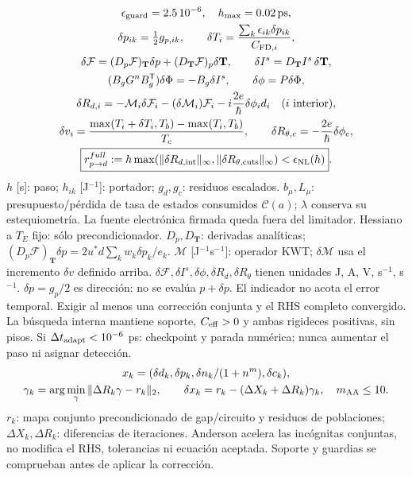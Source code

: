 \documentclass[11pt,a4paper]{article}
\begin{document}
\begin{gather}
 \epsilon_{\rm guard}=2.5\,10^{-6},\quad h_{\max}=0.02\,\mathrm{ps},\\
 \delta p_{ik}=\tfrac12g_{p,ik},\qquad
 \delta T_i=\frac{\sum_k\epsilon_{ik}\delta p_{ik}}{C_{{\rm FD},i}},\\
 \delta\mathcal F=(D_p\mathcal F)_{\mathbf T}\delta p+
 (D_{\mathbf T}\mathcal F)_p\delta\mathbf T,\qquad
 \delta I^s=D_{\mathbf T}I^s\,\delta\mathbf T,\\
 (B_gG^nB_g^{\mathsf T})\delta\Phi=-B_g\delta I^s,\qquad
 \delta\phi=P\delta\Phi,\\
 \delta R_{d,i}=-\mathcal M_i\delta\mathcal F_i
 -(\delta\mathcal M_i)\mathcal F_i
 -i\frac{2e}{\hbar}\delta\phi_i d_i\quad(i\ {\rm interior}),\\
 \delta v_i=\frac{\max(T_i+\delta T_i,T_b)-\max(T_i,T_b)}{T_c},
 \qquad \delta R_{\theta,c}=-\frac{2e}{\hbar}\delta\phi_c,\\
 \boxed{r_{p\to d}^{full}:=h\max\!
 \left(\|\delta R_{d,\rm int}\|_\infty,
       \|\delta R_{\theta,\rm cuts}\|_\infty\right)
 <\epsilon_{\rm NL}(h)}.
\end{gather}
{\small $h$ [s]: paso; $h_{ik}$ [J$^{-1}$]: portador; $g_d,g_c$: residuos escalados.
$b_\mu,L_\mu$: presupuesto/pérdida de tasa de estados consumidos $\mathcal C(a)$; $\lambda$ conserva su estequiometría.
La fuente electrónica firmada queda fuera del limitador. Hessiano a $T_E$ fijo: sólo precondicionador.}
{\small $D_p,D_{\mathbf T}$: derivadas analíticas; $(D_p\mathcal F)_{\mathbf T}\delta p=2u^*d\sum_kw_k\delta p_k/e_k$.
$\mathcal M$ [J$^{-1}$s$^{-1}$]: operador KWT; $\delta\mathcal M$ usa el incremento $\delta v$ definido arriba.
$\delta\mathcal F,\delta I^s,\delta\phi,\delta R_d,\delta R_\theta$ tienen unidades J, A, V, s$^{-1}$, s$^{-1}$.
$\delta p=g_p/2$ es dirección: no se evalúa $p+\delta p$. El indicador no acota el error temporal.}
{\small Exigir al menos una corrección conjunta y el RHS completo convergido.
La búsqueda interna mantiene soporte, $C_{\rm eff}>0$ y ambas rigideces positivas, sin pisos.
Si $\Delta t_{\rm adapt}<10^{-6}$ ps: checkpoint y parada numérica; nunca aumentar el paso ni asignar detección.}
\begin{gather}
 x_k=(\delta d_k,\delta p_k,\delta n_k/(1+n^m),\delta c_k),\\
 \gamma_k=\arg\min_\gamma\|\Delta R_k\gamma-r_k\|_2,\qquad
 \delta x_k=r_k-(\Delta X_k+\Delta R_k)\gamma_k,\quad m_{\rm AA}\le10.
\end{gather}
{\small \(r_k\): mapa conjunto precondicionado de gap/circuito y residuos de poblaciones;
\(\Delta X_k,\Delta R_k\): diferencias de iteraciones. Anderson acelera las incógnitas conjuntas, no modifica el RHS, tolerancias ni ecuación aceptada. Soporte y guardias se comprueban antes de aplicar la corrección.}
\end{document}
